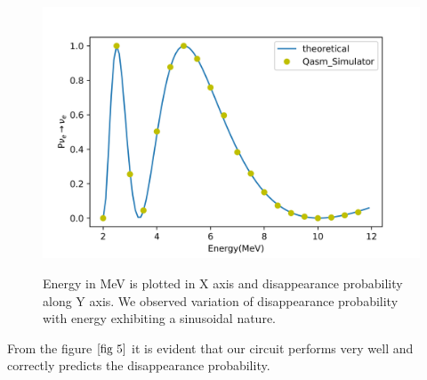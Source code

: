\documentclass[12pt,a4paper]{report}
\begin{document}
\begin{figure}[H]
	\graphicspath{ {./Images/} }
	\centering	
	{\includegraphics[width=\textwidth]{fig_5.png}}
	\caption{Energy in MeV is plotted in X axis and disappearance probability along Y axis. We observed variation of disappearance probability with energy exhibiting a sinusoidal nature.  }
	\label{fig 5}
\end{figure}\par
From the figure $\ref*{fig 5}$ it is evident that our circuit performs very well and correctly predicts the disappearance probability.
\end{document}
